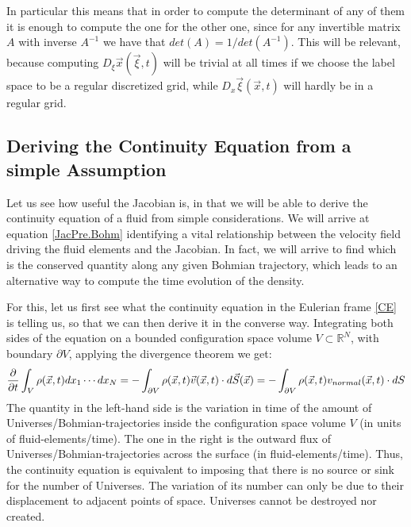 \documentclass[11pt, a4paper]{article} %
\newcommand{\R}{\mathbb{R}} %
\begin{document}
In particular this means that in order to compute the determinant of any of them it is enough to compute the one for the other one, since for any invertible matrix $A$ with inverse $A^{-1}$ we have that $det(A)=1/det(A^{-1})$. This will be relevant, because computing $D_\xi \vec{x}(\vec{\xi},t)$ will be trivial at all times if we choose the label space to be a regular discretized grid, while $D_x \vec{\xi}(\vec{x},t)$ will hardly be in a regular grid.

\subsection*{Deriving the Continuity Equation from a simple Assumption \vspace{-0.2cm} }
Let us see how useful the Jacobian is, in that we will be able to derive the continuity equation of a fluid from simple considerations. We will arrive at equation \eqref{JacPre.Bohm} identifying a vital relationship between the velocity field driving the fluid elements and the Jacobian. In fact, we will arrive to find which is the conserved quantity along any given Bohmian trajectory, which leads to an alternative way to compute the time evolution of the density.

For this, let us first see what the continuity equation in the Eulerian frame \eqref{CE} is telling us, so that we can then derive it in the converse way. Integrating both sides of the equation on a bounded configuration space volume $V\subset\R^N$, with boundary $\partial V$, applying the divergence theorem we get:
\begin{equation}
\pdv{}{t} \int_{V} \rho(\vec{x},t) dx_1\cdots dx_N=-\int_{\partial V} \rho(\vec{x},t)\vec{v}(\vec{x},t)\cdot d\vec{S}(\vec{x})=-\int_{\partial V} \rho(\vec{x},t)v_{normal}(\vec{x},t)\cdot dS
\end{equation}
The quantity in the left-hand side is the variation in time of the amount of Universes/Bohmian-trajectories inside the configuration space volume $V$ (in units of fluid-elements/time). The one in the right is the outward flux of Universes/Bohmian-trajectories across the surface (in fluid-elements/time). Thus, the continuity equation is equivalent to imposing that there is no source or sink for the number of Universes. The variation of its number can only be due to their displacement to adjacent points of space. Universes cannot be destroyed nor created.
\end{document}
